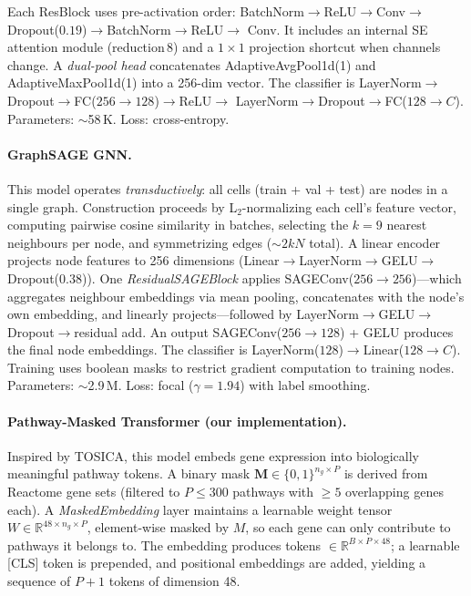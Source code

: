 \documentclass[11pt,letterpaper]{article}
\begin{document}
\noindent Each ResBlock uses pre-activation order:
BatchNorm$\to$ReLU$\to$Conv$\to$Dropout($0.19$)$\to$BatchNorm$\to$ReLU$\to$%
Conv.
It includes an internal SE attention module (reduction\,8) and a $1{\times}1$
projection shortcut when channels change. A \emph{dual-pool head} concatenates
AdaptiveAvgPool1d(1) and AdaptiveMaxPool1d(1) into a 256-dim vector. The
classifier is LayerNorm$\to$Dropout$\to$FC($256{\to}128$)$\to$ReLU$\to$%
LayerNorm$\to$Dropout$\to$FC($128{\to}C$).
Parameters: ${\sim}$58\,K. Loss: cross-entropy.

\paragraph{GraphSAGE GNN.}
This model operates \emph{transductively}: all cells (train + val + test) are
nodes in a single graph. Construction proceeds by L$_2$-normalizing each cell's
feature vector, computing pairwise cosine similarity in batches, selecting the
$k{=}9$ nearest neighbours per node, and symmetrizing edges (${\sim}2kN$ total).
A linear encoder projects node features to 256 dimensions
(Linear$\to$LayerNorm$\to$GELU$\to$Dropout($0.38$)). One
\emph{ResidualSAGEBlock} applies SAGEConv($256 \to 256$)---which aggregates
neighbour embeddings via mean pooling, concatenates with the node's own
embedding, and linearly projects---followed by
LayerNorm$\to$GELU$\to$Dropout$\to$residual add. An output SAGEConv($256 \to
128$) + GELU produces the final node embeddings. The classifier is
LayerNorm($128$)$\to$Linear($128 \to C$). Training uses boolean masks to
restrict gradient computation to training nodes. Parameters: ${\sim}$2.9\,M.
Loss: focal ($\gamma{=}1.94$) with label smoothing.

\paragraph{Pathway-Masked Transformer (our implementation).}
Inspired by TOSICA, this model embeds gene expression into biologically
meaningful pathway tokens. A binary mask
$\mathbf{M} \in \{0,1\}^{n_g \times P}$ is derived from Reactome gene sets
(filtered to $P{\leq}300$ pathways with ${\geq}5$ overlapping genes each). A
\emph{MaskedEmbedding} layer maintains a learnable weight tensor
$W \in \mathbb{R}^{48 \times n_g \times P}$, element-wise masked by $M$, so
each gene can only contribute to pathways it belongs to. The embedding produces
tokens $\in \mathbb{R}^{B \times P \times 48}$; a learnable [CLS] token is
prepended, and positional embeddings are added, yielding a sequence of $P{+}1$
tokens of dimension 48.
\end{document}
